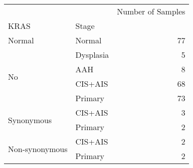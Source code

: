 \begin{tabular}{l|lr}
\toprule
               &         & Number of Samples \\
KRAS & Stage &                   \\
\midrule
Normal & Normal &                77 \\
\multirow{4}{*}{No} & Dysplasia &                 5 \\
               & AAH &                 8 \\
               & CIS+AIS &                68 \\
               & Primary &                73 \\
\cline{1-3}
\multirow{2}{*}{Synonymous} & CIS+AIS &                 3 \\
               & Primary &                 2 \\
\cline{1-3}
\multirow{2}{*}{Non-synonymous} & CIS+AIS &                 2 \\
               & Primary &                 2 \\
\bottomrule
\end{tabular}
